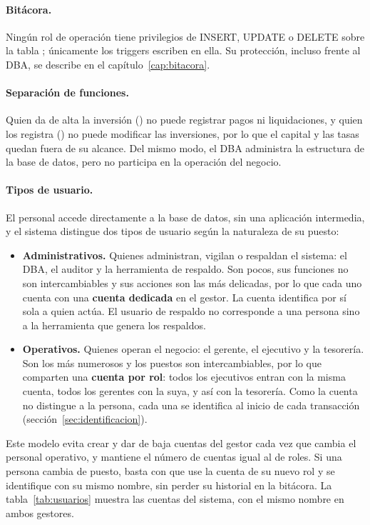 \paragraph{Bit\'acora.} Ning\'un rol de operaci\'on tiene privilegios de INSERT, UPDATE o DELETE sobre la tabla ; \'unicamente los triggers escriben en ella. Su protecci\'on, incluso frente al DBA, se describe en el cap\'itulo~\ref{cap:bitacora}.

\paragraph{Separaci\'on de funciones.} Quien da de alta la inversi\'on () no puede registrar pagos ni liquidaciones, y quien los registra () no puede modificar las inversiones, por lo que el capital y las tasas quedan fuera de su alcance. Del mismo modo, el DBA administra la estructura de la base de datos, pero no participa en la operaci\'on del negocio.	

\paragraph{Tipos de usuario.} El personal accede directamente a la base de datos, sin una aplicación intermedia, y el sistema distingue dos tipos de usuario según la naturaleza de su puesto:

\begin{itemize}
	\item \textbf{Administrativos.} Quienes administran, vigilan o respaldan el sistema: el DBA, el auditor y la herramienta de respaldo. Son pocos, sus funciones no son intercambiables y sus acciones son las más delicadas, por lo que cada uno cuenta con una \textbf{cuenta dedicada} en el gestor. La cuenta identifica por sí sola a quien actúa. El usuario de respaldo no corresponde a una persona sino a la herramienta que genera los respaldos.
	\item \textbf{Operativos.} Quienes operan el negocio: el gerente, el ejecutivo y la tesorería. Son los más numerosos y los puestos son intercambiables, por lo que comparten una \textbf{cuenta por rol}: todos los ejecutivos entran con la misma cuenta, todos los gerentes con la suya, y así con la tesorería. Como la cuenta no distingue a la persona, cada una se identifica al inicio de cada transacción (sección~\ref{sec:identificacion}).
\end{itemize}

Este modelo evita crear y dar de baja cuentas del gestor cada vez que cambia el personal operativo, y mantiene el número de cuentas igual al de roles. Si una persona cambia de puesto, basta con que use la cuenta de su nuevo rol y se identifique con su mismo nombre, sin perder su historial en la bitácora. La tabla~\ref{tab:usuarios} muestra las cuentas del sistema, con el mismo nombre en ambos gestores.

